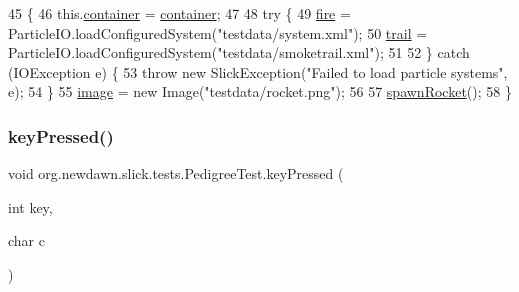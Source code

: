 \begin{DoxyCode}
45                                                                     \{
46         this.\mbox{\hyperlink{classorg_1_1newdawn_1_1slick_1_1tests_1_1_pedigree_test_a803d53a8e6fe77152a4710313def6132}{container}} = \mbox{\hyperlink{classorg_1_1newdawn_1_1slick_1_1tests_1_1_pedigree_test_a803d53a8e6fe77152a4710313def6132}{container}};
47         
48         \textcolor{keywordflow}{try} \{
49             \mbox{\hyperlink{classorg_1_1newdawn_1_1slick_1_1tests_1_1_pedigree_test_a357e9f5bc41de79c98bb219355467638}{fire}} = ParticleIO.loadConfiguredSystem(\textcolor{stringliteral}{"testdata/system.xml"});
50             \mbox{\hyperlink{classorg_1_1newdawn_1_1slick_1_1tests_1_1_pedigree_test_ac8fed7baa305c06ec8168b5947d3c2c8}{trail}} = ParticleIO.loadConfiguredSystem(\textcolor{stringliteral}{"testdata/smoketrail.xml"});
51             
52         \} \textcolor{keywordflow}{catch} (IOException e) \{
53             \textcolor{keywordflow}{throw} \textcolor{keyword}{new} SlickException(\textcolor{stringliteral}{"Failed to load particle systems"}, e);
54         \}
55         \mbox{\hyperlink{classorg_1_1newdawn_1_1slick_1_1tests_1_1_pedigree_test_a9a83fdf6eb3960d294e976dfd2896a2f}{image}} = \textcolor{keyword}{new} Image(\textcolor{stringliteral}{"testdata/rocket.png"});
56     
57         \mbox{\hyperlink{classorg_1_1newdawn_1_1slick_1_1tests_1_1_pedigree_test_a007e9eeb102e627c99150fb945f41b5d}{spawnRocket}}();
58     \}
\end{DoxyCode}
\mbox{\label{classorg_1_1newdawn_1_1slick_1_1tests_1_1_pedigree_test_ab5e99c7998057eb96d5cc510a442953e}} 
\subsubsection{\texorpdfstring{key\+Pressed()}{keyPressed()}}
{\footnotesize\ttfamily void org.\+newdawn.\+slick.\+tests.\+Pedigree\+Test.\+key\+Pressed (\begin{DoxyParamCaption}\item[{int}]{key,  }\item[{char}]{c }\end{DoxyParamCaption})\hspace{0.3cm}{\ttfamily [inline]}}

